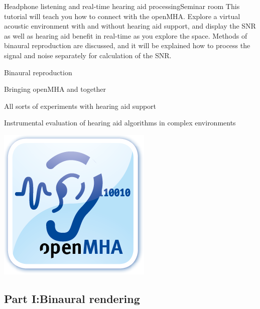 \documentclass[11pt,a4paper,twoside]{article}
\begin{document}
\setcounter{tutorial}{2}
\begin{tutorial}{Headphone listening and real-time hearing aid processing}{Seminar room}
This tutorial will teach you how to connect \tascar{} with the openMHA.
%
Explore a virtual acoustic environment with and without hearing aid
support, and display the SNR as well as hearing aid benefit in
real-time as you explore the space.
%
Methods of binaural reproduction are discussed, and it will be
explained how to process the signal and noise separately for
calculation of the SNR.

  \begin{learnitems}
  \item Binaural reproduction
  \item Bringing openMHA and \tascar{} together
  \end{learnitems}

  \begin{appitems}
  \item All sorts of experiments with hearing aid support
  \item Instrumental evaluation of hearing aid algorithms in complex
    environments
  \end{appitems}


\hfill{\includegraphics[width=0.2\columnwidth]{logo_openMHA}~}
\end{tutorial}

\ifshowtutorial

\newpage

\subsection*{Part I:Binaural rendering}
\end{document}
